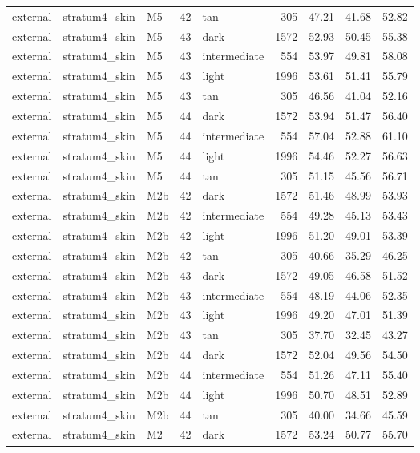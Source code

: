 \begin{tabular}{lllrlrrrr}
external & stratum4\_skin & M5 & 42 & tan & 305 & 47.21 & 41.68 & 52.82 \\
external & stratum4\_skin & M5 & 43 & dark & 1572 & 52.93 & 50.45 & 55.38 \\
external & stratum4\_skin & M5 & 43 & intermediate & 554 & 53.97 & 49.81 & 58.08 \\
external & stratum4\_skin & M5 & 43 & light & 1996 & 53.61 & 51.41 & 55.79 \\
external & stratum4\_skin & M5 & 43 & tan & 305 & 46.56 & 41.04 & 52.16 \\
external & stratum4\_skin & M5 & 44 & dark & 1572 & 53.94 & 51.47 & 56.40 \\
external & stratum4\_skin & M5 & 44 & intermediate & 554 & 57.04 & 52.88 & 61.10 \\
external & stratum4\_skin & M5 & 44 & light & 1996 & 54.46 & 52.27 & 56.63 \\
external & stratum4\_skin & M5 & 44 & tan & 305 & 51.15 & 45.56 & 56.71 \\
external & stratum4\_skin & M2b & 42 & dark & 1572 & 51.46 & 48.99 & 53.93 \\
external & stratum4\_skin & M2b & 42 & intermediate & 554 & 49.28 & 45.13 & 53.43 \\
external & stratum4\_skin & M2b & 42 & light & 1996 & 51.20 & 49.01 & 53.39 \\
external & stratum4\_skin & M2b & 42 & tan & 305 & 40.66 & 35.29 & 46.25 \\
external & stratum4\_skin & M2b & 43 & dark & 1572 & 49.05 & 46.58 & 51.52 \\
external & stratum4\_skin & M2b & 43 & intermediate & 554 & 48.19 & 44.06 & 52.35 \\
external & stratum4\_skin & M2b & 43 & light & 1996 & 49.20 & 47.01 & 51.39 \\
external & stratum4\_skin & M2b & 43 & tan & 305 & 37.70 & 32.45 & 43.27 \\
external & stratum4\_skin & M2b & 44 & dark & 1572 & 52.04 & 49.56 & 54.50 \\
external & stratum4\_skin & M2b & 44 & intermediate & 554 & 51.26 & 47.11 & 55.40 \\
external & stratum4\_skin & M2b & 44 & light & 1996 & 50.70 & 48.51 & 52.89 \\
external & stratum4\_skin & M2b & 44 & tan & 305 & 40.00 & 34.66 & 45.59 \\
external & stratum4\_skin & M2 & 42 & dark & 1572 & 53.24 & 50.77 & 55.70 \\

\end{tabular}
